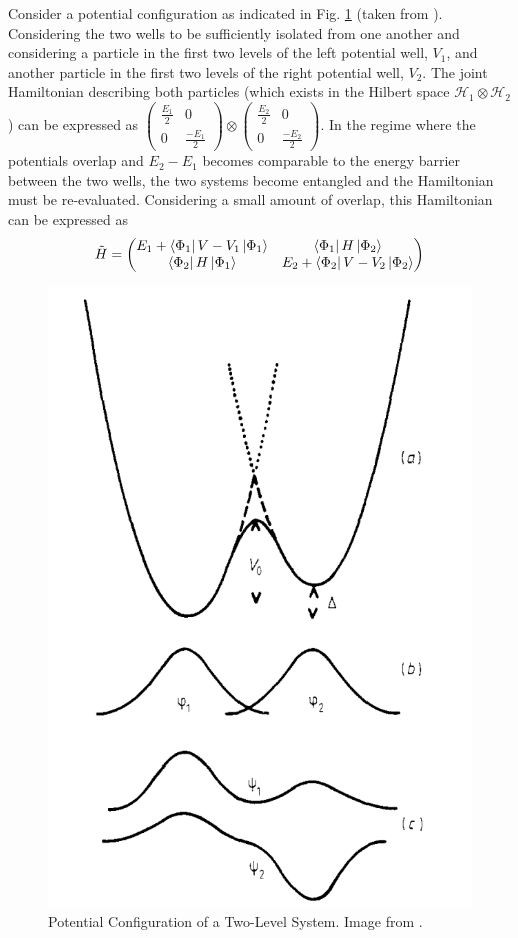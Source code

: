 \documentclass[aps,prl,reprint,groupedaddress]{revtex4-1}
\begin{document}
Consider a potential configuration as indicated in Fig. \ref{CoupPot} (taken from \cite{phillips_two-level_1987}). Considering the two wells to be sufficiently isolated from one another and considering a particle in the first two levels of the left potential well, $V_1$, and another particle in the first two levels of the right potential well, $V_2$. The joint Hamiltonian describing both particles (which exists in the Hilbert space $\mathcal{H}_1 \otimes \mathcal{H}_2$) can be expressed as $\begin{pmatrix} \frac{E_1}{2} & 0 \\ 0 & \frac{-E_1}{2} \end{pmatrix} \otimes \begin{pmatrix}\frac{E_2}{2} & 0 \\ 0 & \frac{-E_2}{2} \end{pmatrix}$. In the regime where the potentials overlap and $E_2 - E_1$ becomes comparable to the energy barrier between the two wells, the two systems become entangled and the Hamiltonian must be re-evaluated. Considering a small amount of overlap, this Hamiltonian can be expressed as \[ \tilde{H} = \begin{pmatrix} E_1 + \bra{\Phi_1}V-V_1\ket{\Phi_1} & \bra{\Phi_1}H\ket{\Phi_2} \\ \bra{\Phi_2}H\ket{\Phi_1} & E_2 + \bra{\Phi_2}V-V_2\ket{\Phi_2} \end{pmatrix} \]

\begin{figure}%
\includegraphics[width=.7\columnwidth,natwidth=615,natheight=901]{../CoupledPotentials.png}%
\caption{Potential Configuration of a Two-Level System. Image from \cite{phillips_two-level_1987}.}%
\label{CoupPot}%
\end{figure}
\end{document}
